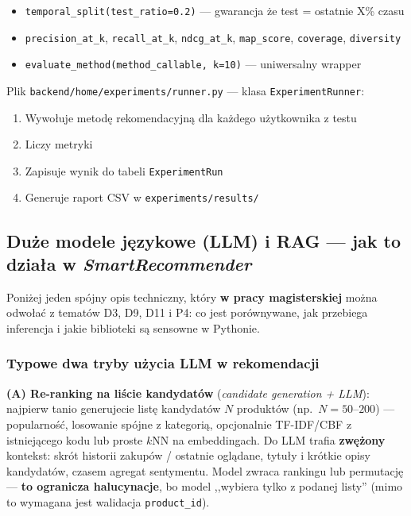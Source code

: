 \documentclass[a4paper,11pt]{article}
\newcommand{\code}[1]{\texttt{\small #1}}
\begin{document}
\begin{itemize}[leftmargin=1.5em,itemsep=2pt]
  \item \code{temporal\_split(test\_ratio=0.2)} --- gwarancja że test = ostatnie X\% czasu
  \item \code{precision\_at\_k}, \code{recall\_at\_k}, \code{ndcg\_at\_k}, \code{map\_score}, \code{coverage}, \code{diversity}
  \item \code{evaluate\_method(method\_callable, k=10)} --- uniwersalny wrapper
\end{itemize}

Plik \code{backend/home/experiments/runner.py} --- klasa \code{ExperimentRunner}:

\begin{enumerate}[leftmargin=1.5em,itemsep=2pt]
  \item Wywołuje metodę rekomendacyjną dla każdego użytkownika z testu
  \item Liczy metryki
  \item Zapisuje wynik do tabeli \code{ExperimentRun}
  \item Generuje raport CSV w \code{experiments/results/}
\end{enumerate}

\subsection{Duże modele językowe (LLM) i RAG --- jak to działa w \emph{SmartRecommender}}\label{sec:llm-stack}

Poniżej jeden spójny opis techniczny, który \textbf{w pracy magisterskiej} można odwołać z tematów D3, D9, D11 i P4: co jest porównywane, jak przebiega inferencja i jakie biblioteki są sensowne w Pythonie.

\subsubsection{Typowe dwa tryby użycia LLM w rekomendacji}

\textbf{(A) Re-ranking na liście kandydatów} (\emph{candidate generation + LLM}): najpierw tanio generujecie listę kandydatów $N$ produktów (np.\ $N=50$--$200$) --- popularność, losowanie spójne z kategorią, opcjonalnie TF-IDF/CBF z istniejącego kodu lub proste $k$NN na embeddingach. Do LLM trafia \textbf{zwężony} kontekst: skrót historii zakupów / ostatnie oglądane, tytuły i krótkie opisy kandydatów, czasem agregat sentymentu. Model zwraca rankingu lub permutację --- \textbf{to ogranicza halucynacje}, bo model ,,wybiera tylko z podanej listy'' (mimo to wymagana jest walidacja \code{product\_id}).
\end{document}
